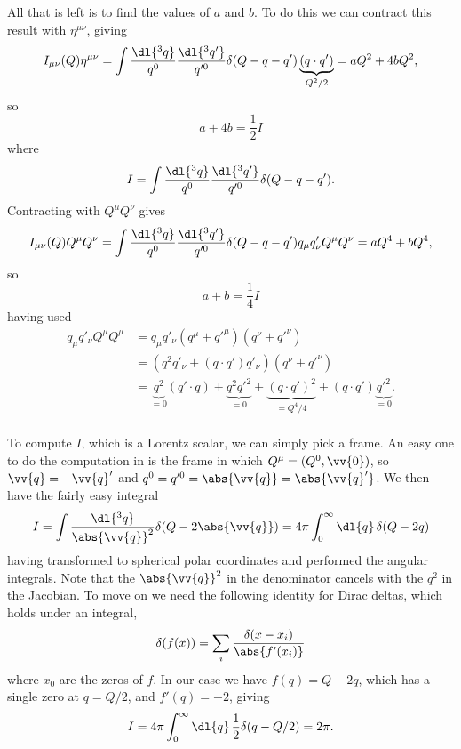 \documentclass[fleqn]{NotesClass}
\newcommand{\minkowskiMetric}{\eta}
\begin{document}
    All that is left is to find the values of \(a\) and \(b\).
    To do this we can contract this result with \(\minkowskiMetric^{\mu\nu}\), giving
    \begin{equation}
        I_{\mu\nu}(Q)\minkowskiMetric^{\mu\nu} = \int \frac{\dl{^3q}}{q^0} \frac{\dl{^3q'}}{q'^0} \delta(Q - q - q') \underbrace{(q \cdot q')}_{Q^2/2} = aQ^2 + 4bQ^2,
    \end{equation}
    so
    \begin{equation}
        a + 4b = \frac{1}{2}I
    \end{equation}
    where
    \begin{equation}
        I = \int \frac{\dl{^3q}}{q^0} \frac{\dl{^3q'}}{q'^0} \delta(Q - q - q').
    \end{equation}
    Contracting  with \(Q^\mu Q^\nu\) gives
    \begin{equation}
        I_{\mu\nu}(Q)Q^\mu Q^\nu = \int \frac{\dl{^3q}}{q^0} \frac{\dl{^3q'}}{q'^0} \delta(Q - q - q') q_\mu q'_\nu Q^\mu Q^\nu = aQ^4 + bQ^4,
    \end{equation}
    so
    \begin{equation}
        a + b = \frac{1}{4}I
    \end{equation}
    having used
    \begin{align}
        q_\mu q'_\nu Q^\mu Q^\mu &= q_\mu q'_\nu (q^\mu + q'^\mu)(q^\nu + q'^\nu)\\
        &= (q^2q'_\nu + (q \cdot q')q'_\nu)(q^\nu + q'^\nu)\\
        &= \underbrace{q^2}_{=0}(q' \cdot q) + \underbrace{q^2q'^2}_{=0} + \underbrace{(q \cdot q')^2}_{=Q^4/4} + (q \cdot q')\underbrace{q'^2}_{=0}.\\
    \end{align}
    
    To compute \(I\), which is a Lorentz scalar, we can simply pick a frame.
    An easy one to do the computation in is the frame in which \(Q^\mu = (Q^0, \vv{0})\), so \(\vv{q} = -\vv{q}'\) and \(q^0 = q'^0 = \abs{\vv{q}} = \abs{\vv{q}'}\).
    We then have the fairly easy integral
    \begin{equation}
        I = \int \frac{\dl{^3q}}{\abs{\vv{q}}^2} \delta(Q - 2\abs{\vv{q}}) = 4\pi \int_0^\infty \dl{q} \, \delta(Q - 2q)
    \end{equation}
    having transformed to spherical polar coordinates and performed the angular integrals.
    Note that the \(\abs{\vv{q}}^2\) in the denominator cancels with the \(q^2\) in the Jacobian.
    To move on we need the following identity for Dirac deltas, which holds under an integral,
    \begin{equation}
        \delta(f(x)) = \sum_{i} \frac{\delta(x - x_i)}{\abs{f'(x_i)}}
    \end{equation}
    where \(x_0\) are the zeros of \(f\).
    In our case we have \(f(q) = Q - 2q\), which has a single zero at \(q = Q/2\), and \(f'(q) = -2\), giving
    \begin{equation}
        I = 4\pi \int_0^{\infty} \dl{q} \, \frac{1}{2} \delta(q - Q/2) = 2\pi.
    \end{equation}
    
\end{document}
